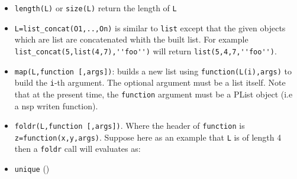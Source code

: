 \begin{itemize}
   \item \verb+length(L)+ or \verb+size(L)+ return the length of \verb+L+
   \item \verb+L=list_concat(O1,..,On)+ is similar to \verb+list+ except that 
     the given objects which are list are concatenated whith the built list. 
     For example \verb+list_concat(5,list(4,7),''foo'')+ will return 
     \verb+list(5,4,7,''foo'')+.
   \item \verb+map(L,function [,args])+: builds a new list using 
     \verb+function(L(i),args)+ to build the \verb+i+-th argument. 
     The optional argument must be a list itself. Note that at the present time,
     the \verb+function+ argument must be a PList object (i.e a nsp writen function).
   \item \verb+foldr(L,function [,args])+. Where the header of \verb+function+ is 
     \verb+z=function(x,y,args)+. Suppose here as an example that \verb+L+ is of 
     length 4 then a \verb+foldr+  call will evaluates as:
     \begin{program}
     \end{program}
   \item \verb+unique+ () 
\end{itemize}

